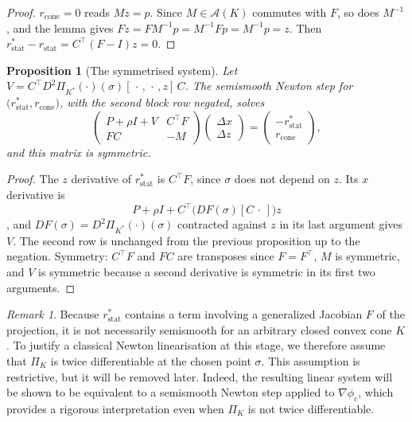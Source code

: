 \documentclass[a4paper,11pt]{book}
\theoremstyle{plain}
\newtheorem{proposition}[theorem]{Proposition}
\theoremstyle{definition}
\theoremstyle{remark}
\newtheorem{remark}[theorem]{Remark}
\numberwithin{equation}{chapter}
\numberwithin{algorithm}{chapter}
\newcommand{\proj}[2]{\Pi_{#2}\!\left(#1\right)}
\begin{document}
	\begin{proof}
		$r_{\mathrm{cone}}=0$ reads $Mz=p$. Since $M\in\mathcal{A}(K)$ commutes with
		$F$, so does $M^{-1}$, and the lemma gives
		$Fz=FM^{-1}p=M^{-1}Fp=M^{-1}p=z$. Then
		$r^{*}_{\mathrm{stat}}-r_{\mathrm{stat}}=C^\top(F-I)z=0$.
	\end{proof}
	
	\begin{proposition}[The symmetrised system]
		Let $V=C^\top D^2\proj{\cdot}{K^*}(\sigma)[\,\cdot\,,\,\cdot\,,z]\,C$. The
		semismooth Newton step for
		$\bigl(r^{*}_{\mathrm{stat}},r_{\mathrm{cone}}\bigr)$, with the second block
		row negated, solves
		\begin{equation}
			\begin{pmatrix}
				P+\rho I+V & C^\top F\\
				FC & -M
			\end{pmatrix}
			\begin{pmatrix}\Delta x\\ \Delta z\end{pmatrix}
			=\begin{pmatrix}-r^{*}_{\mathrm{stat}}\\ r_{\mathrm{cone}}\end{pmatrix} ,
		\end{equation}
		and this matrix is symmetric.
	\end{proposition}
	
	\begin{proof}
		The $z$ derivative of $r^{*}_{\mathrm{stat}}$ is $C^\top F$, since $\sigma$
		does not depend on $z$. Its $x$ derivative is
		$$P+\rho I+C^\top\bigl(DF(\sigma)[C\,\cdot\,]\bigr)z$$, and
		$DF(\sigma)=D^2\proj{\cdot}{K^*}(\sigma)$ contracted against $z$ in its last
		argument gives $V$. The second row is unchanged from the previous proposition
		up to the negation. Symmetry: $C^\top F$ and $FC$ are transposes since
		$F=F^\top$, $M$ is symmetric, and $V$ is symmetric because a second derivative
		is symmetric in its first two arguments.
	\end{proof}
	
	\begin{remark}
		Because \(r_{\mathrm{stat}}^*\) contains a term involving a generalized Jacobian
		\(F\) of the projection, it is not necessarily semismooth for an arbitrary
		closed convex cone \(K\). To justify a classical Newton linearisation at this
		stage, we therefore assume that \(\Pi_K\) is twice differentiable at the chosen
		point \(\sigma\). This assumption is restrictive, but it will be removed later.
		Indeed, the resulting linear system will be shown to be equivalent to a
		semismooth Newton step applied to \(\nabla\phi_c\), which provides a rigorous
		interpretation even when \(\Pi_K\) is not twice differentiable.
	\end{remark}
	
\end{document}
